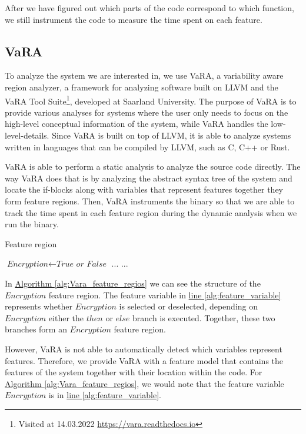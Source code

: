 After we have figured out which parts of the code correspond to which function, we still instrument the code to measure the time spent on each feature.

\subsection{VaRA}\label{VaRA}
To analyze the system we are interested in, we use VaRA, a variability aware region analyzer, a framework for analyzing software built on LLVM
and the VaRA Tool Suite\footnote{Visited at 14.03.2022 \url{https://vara.readthedocs.io}}, developed at Saarland University. 
The purpose of VaRA is to provide various analyses for systems where the user only needs to focus on the high-level conceptual information of the 
system, while VaRA handles the low-level-details. 
Since VaRA is built on top of LLVM, it is able to analyze systems written in languages that can be compiled by LLVM, such as C, C++ or Rust. 

VaRA is able to perform a static analysis to analyze the source code directly. The way VaRA does that is by analyzing the
abstract syntax tree of the system and locate the if-blocks along with variables that represent features together they form 
feature regions. Then, VaRA instruments the binary so that we are able to track the time spent in each feature region
during the dynamic analysis when we run the binary. \cite{VaRA-Flo}

\begin{algorithm}
    \caption{Feature region}\label{alg:Vara_feature_regios}
    \begin{algorithmic}[1]            
        \State $\textit{Encryption} \gets \textit{True or False}$\label{alg:feature_variable}
            \State $\textit{...}$
        \Else
            \State $\textit{...}$
        \EndIf    
    \end{algorithmic}
\end{algorithm}

In \hyperref[alg:Vara_feature_regios]{Algorithm \ref*{alg:Vara_feature_regios}} we can see the structure of the $Encryption$ feature region. The
feature variable in \hyperref[alg:feature_variable]{line \ref{alg:feature_variable}} represents whether $Encryption$ is selected or deselected, 
depending on $Encryption$ either the $then$ or $else$ branch is executed. 
Together, these two branches form an $Encryption$ feature region.

However, VaRA is not able to automatically detect which variables represent features. Therefore, we provide VaRA with a feature
model that contains the features of the system together with their location within the code. 
For \hyperref[alg:Vara_feature_regios]{Algorithm \ref*{alg:Vara_feature_regios}}, we would note that the feature variable
$Encryption$ is in \hyperref[alg:feature_variable]{line \ref{alg:feature_variable}}.

